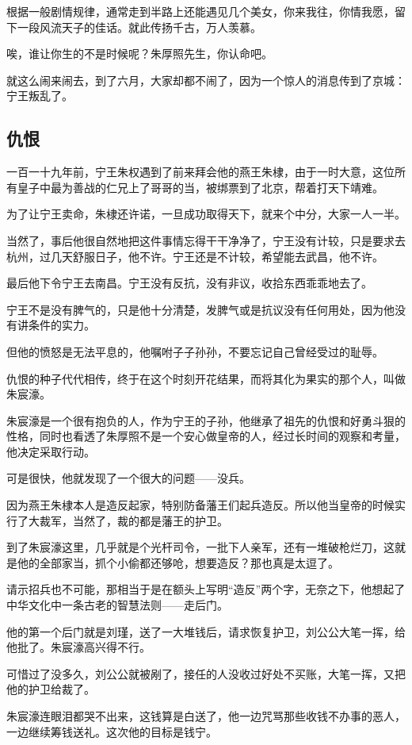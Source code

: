 \begin{multicols}{\theparacolNo}
根据一般剧情规律，通常走到半路上还能遇见几个美女，你来我往，你情我愿，留下一段风流天子的佳话。就此传扬千古，万人羡慕。

唉，谁让你生的不是时候呢？朱厚照先生，你认命吧。

就这么闹来闹去，到了六月，大家却都不闹了，因为一个惊人的消息传到了京城：宁王叛乱了。

\subsection{仇恨}
一百一十九年前，宁王朱权遇到了前来拜会他的燕王朱棣，由于一时大意，这位所有皇子中最为善战的仁兄上了哥哥的当，被绑票到了北京，帮着打天下靖难。

为了让宁王卖命，朱棣还许诺，一旦成功取得天下，就来个中分，大家一人一半。

当然了，事后他很自然地把这件事情忘得干干净净了，宁王没有计较，只是要求去杭州，过几天舒服日子，他不许。宁王还是不计较，希望能去武昌，他不许。

最后他下令宁王去南昌。宁王没有反抗，没有非议，收拾东西乖乖地去了。

宁王不是没有脾气的，只是他十分清楚，发脾气或是抗议没有任何用处，因为他没有讲条件的实力。

但他的愤怒是无法平息的，他嘱咐子子孙孙，不要忘记自己曾经受过的耻辱。

仇恨的种子代代相传，终于在这个时刻开花结果，而将其化为果实的那个人，叫做朱宸濠。

朱宸濠是一个很有抱负的人，作为宁王的子孙，他继承了祖先的仇恨和好勇斗狠的性格，同时也看透了朱厚照不是一个安心做皇帝的人，经过长时间的观察和考量，他决定采取行动。

可是很快，他就发现了一个很大的问题——没兵。

因为燕王朱棣本人是造反起家，特别防备藩王们起兵造反。所以他当皇帝的时候实行了大裁军，当然了，裁的都是藩王的护卫。

到了朱宸濠这里，几乎就是个光杆司令，一批下人亲军，还有一堆破枪烂刀，这就是他的全部家当，抓个小偷都还够呛，想要造反？那也真是太逗了。

请示招兵也不可能，那相当于是在额头上写明“造反”两个字，无奈之下，他想起了中华文化中一条古老的智慧法则——走后门。

他的第一个后门就是刘瑾，送了一大堆钱后，请求恢复护卫，刘公公大笔一挥，给他批了。朱宸濠高兴得不行。

可惜过了没多久，刘公公就被剐了，接任的人没收过好处不买账，大笔一挥，又把他的护卫给裁了。

朱宸濠连眼泪都哭不出来，这钱算是白送了，他一边咒骂那些收钱不办事的恶人，一边继续筹钱送礼。这次他的目标是钱宁。


\end{multicols}
